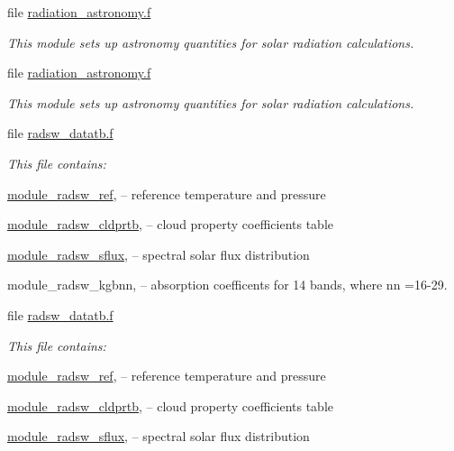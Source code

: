 \begin{DoxyCompactItemize}
file \hyperlink{radiation__astronomy_8f}{radiation\+\_\+astronomy.\+f}
\begin{DoxyCompactList}\small\item\em This module sets up astronomy quantities for solar radiation calculations. \end{DoxyCompactList}\item 
file \hyperlink{radiation__astronomy_8f}{radiation\+\_\+astronomy.\+f}
\begin{DoxyCompactList}\small\item\em This module sets up astronomy quantities for solar radiation calculations. \end{DoxyCompactList}\item 
file \hyperlink{radsw__datatb_8f}{radsw\+\_\+datatb.\+f}
\begin{DoxyCompactList}\small\item\em This file contains\+:
\begin{DoxyEnumerate}
\item \textquotesingle{}\hyperlink{namespacemodule__radsw__ref}{module\+\_\+radsw\+\_\+ref}\textquotesingle{}, -- reference temperature and pressure
\item \textquotesingle{}\hyperlink{namespacemodule__radsw__cldprtb}{module\+\_\+radsw\+\_\+cldprtb}\textquotesingle{}, -- cloud property coefficients table
\item \textquotesingle{}\hyperlink{namespacemodule__radsw__sflux}{module\+\_\+radsw\+\_\+sflux}\textquotesingle{}, -- spectral solar flux distribution
\item \textquotesingle{}module\+\_\+radsw\+\_\+kgbnn\textquotesingle{}, -- absorption coefficents for 14 bands, where nn =16-\/29. 
\end{DoxyEnumerate}\end{DoxyCompactList}\item 
file \hyperlink{radsw__datatb_8f}{radsw\+\_\+datatb.\+f}
\begin{DoxyCompactList}\small\item\em This file contains\+:
\begin{DoxyEnumerate}
\item \textquotesingle{}\hyperlink{namespacemodule__radsw__ref}{module\+\_\+radsw\+\_\+ref}\textquotesingle{}, -- reference temperature and pressure
\item \textquotesingle{}\hyperlink{namespacemodule__radsw__cldprtb}{module\+\_\+radsw\+\_\+cldprtb}\textquotesingle{}, -- cloud property coefficients table
\item \textquotesingle{}\hyperlink{namespacemodule__radsw__sflux}{module\+\_\+radsw\+\_\+sflux}\textquotesingle{}, -- spectral solar flux distribution

\end{DoxyEnumerate}
\end{DoxyCompactList}
\end{DoxyCompactItemize}
